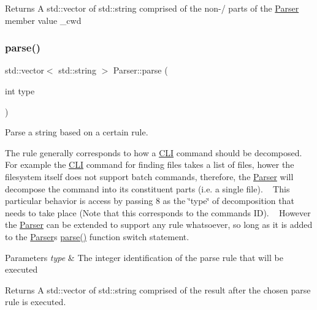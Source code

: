 \begin{DoxyReturn}{Returns}
A std\+::vector of std\+::string comprised of the non-\/\textquotesingle{}/\textquotesingle{} parts of the \mbox{\hyperlink{classParser}{Parser}} member value \+\_\+cwd 
\end{DoxyReturn}
\mbox{\label{classParser_a5b531e9ed867eeb8ccb9cb088cf35c24}} 
\subsubsection{\texorpdfstring{parse()}{parse()}}
{\footnotesize\ttfamily std\+::vector$<$ std\+::string $>$ Parser\+::parse (\begin{DoxyParamCaption}\item[{int}]{type }\end{DoxyParamCaption})}



Parse a string based on a certain rule. 

The rule generally corresponds to how a \mbox{\hyperlink{classCLI}{C\+LI}} command should be decomposed. ~\newline
For example the \mbox{\hyperlink{classCLI}{C\+LI}} command for finding files takes a list of files, hower the filesystem itself does not support batch commands, therefore, the \mbox{\hyperlink{classParser}{Parser}} will decompose the command into its constituent parts (i.\+e. a single file). ~\newline
This particular behavior is access by passing \textquotesingle{}8\textquotesingle{} as the \char`\"{}type\char`\"{} of decomposition that needs to take place (Note that this corresponds to the command\textquotesingle{}s ID). ~\newline
However the \mbox{\hyperlink{classParser}{Parser}} can be extended to support any rule whatsoever, so long as it is added to the \mbox{\hyperlink{classParser}{Parser}}\textquotesingle{}s \mbox{\hyperlink{classParser_a5b531e9ed867eeb8ccb9cb088cf35c24}{parse()}} function switch statement.


\begin{DoxyParams}{Parameters}
{\em type} & The integer identification of the parse rule that will be executed\\
\hline
\end{DoxyParams}
\begin{DoxyReturn}{Returns}
A std\+::vector of std\+::string comprised of the result after the chosen parse rule is executed. 
\end{DoxyReturn}
\mbox{\label{classParser_a87f5e73ca10ef5f84f37a4b37e0e6f59}} 
